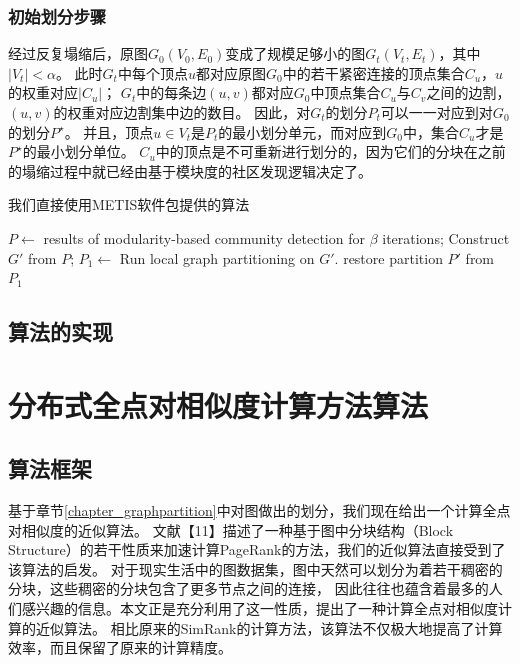 \documentclass[master]{njuthesis}
\begin{document}
\subsection{初始划分步骤}
经过反复塌缩后，原图$G_0(V_0,E_0)$变成了规模足够小的图$G_t(V_t,E_t)$，其中$|V_t| < \alpha$。
此时$G_t$中每个顶点$u$都对应原图$G_0$中的若干紧密连接的顶点集合$C_u$，$u$的权重对应$|C_u|$；
$G_t$中的每条边$(u,v)$都对应$G_0$中顶点集合$C_u$与$C_v$之间的边割，$(u,v)$的权重对应边割集中边的数目。
因此，对$G_t$的划分$P_t$可以一一对应到对$G_0$的划分$P^\star$。
并且，顶点$u \in V_t$是$P_t$的最小划分单元，而对应到$G_0$中，集合$C_u$才是$P^\star$的最小划分单位。
$C_u$中的顶点是不可重新进行划分的，因为它们的分块在之前的塌缩过程中就已经由基于模块度的社区发现逻辑决定了。

我们直接使用METIS软件包提供的算法

\begin{algorithm}[H]
\label{alg:mlgp}
\begin{algorithmic}[1]
		\State $P \gets $ results of modularity-based community detection for $\beta$ iterations;
		\State Construct $G\prime$ from $P$; 
	\EndWhile  
	\State $P_1 \gets $ Run local graph partitioning on $G\prime$. 
	\State restore partition $P\prime$ from $P_1$ 
\EndProcedure
\end{algorithmic}
\end{algorithm}

\section{算法的实现}


\chapter{分布式全点对相似度计算方法算法}\label{chapter_allSimRank}
\section{算法框架}
基于章节\ref{chapter_graphpartition}中对图做出的划分，我们现在给出一个计算全点对相似度的近似算法。
文献【11】描述了一种基于图中分块结构（Block Structure）的若干性质来加速计算PageRank的方法，我们的近似算法直接受到了该算法的启发。
对于现实生活中的图数据集，图中天然可以划分为着若干稠密的分块，这些稠密的分块包含了更多节点之间的连接，
因此往往也蕴含着最多的人们感兴趣的信息。本文正是充分利用了这一性质，提出了一种计算全点对相似度计算的近似算法。
相比原来的SimRank的计算方法，该算法不仅极大地提高了计算效率，而且保留了原来的计算精度。
\end{document}
